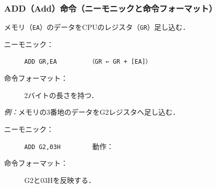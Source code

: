\documentclass{beamer}                 %
\begin{document}
\begin{frame}
  \frametitle{ADD（Add）命令（ニーモニックと命令フォーマット）}
  メモリ（\texttt{EA}）のデータをCPUのレジスタ（\texttt{GR}）足し込む．

  \begin{description}
  \item[ニーモニック：]\texttt{ADD GR,EA}~~~~~~~~~\texttt{（GR ← GR + [EA]）}
    \vfill

  \item[命令フォーマット：] 2バイトの長さを持つ．\\
  \end{description}
  \vfill

  \emph{例：}メモリの3番地のデータをG2レジスタへ足し込む．
  \begin{description}
  \item[ニーモニック：]\texttt{ADD G2,03H}~~~~~~~~~動作：

  \item[命令フォーマット：] G2と03Hを反映する．\\
  \end{description}
  \vfill
\end{frame}
\end{document}
